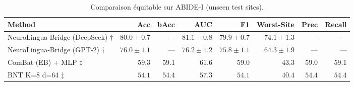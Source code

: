 \begin{table}[h]
\centering
\caption{Comparaison équitable sur ABIDE-I (unseen test sites).}
\label{tab:baseline_comparison}
\begin{tabular}{lrrrrrrr}
\toprule
Method & \textbf{Acc} & \textbf{bAcc} & \textbf{AUC} & \textbf{F1} & \textbf{Worst-Site} & \textbf{Prec} & \textbf{Recall} \\
\midrule
NeuroLingua-Bridge (DeepSeek) $\dagger$ & $80.0\pm0.7$ & --- & $81.1\pm0.8$ & $79.9\pm0.7$ & $74.1\pm1.3$ & --- & --- \\
NeuroLingua-Bridge (GPT-2) $\dagger$ & $76.0\pm1.1$ & --- & $76.2\pm1.2$ & $75.8\pm1.1$ & $64.3\pm1.9$ & --- & --- \\
\midrule
ComBat (EB) + MLP $\ddagger$ & $59.3$ & $59.1$ & $61.6$ & $59.0$ & $43.3$ & $59.0$ & $59.1$ \\
BNT K=8 d=64 $\ddagger$ & $54.1$ & $54.4$ & $57.3$ & $54.1$ & $40.4$ & $54.4$ & $54.4$ \\
\bottomrule
\end{tabular}
\end{table}